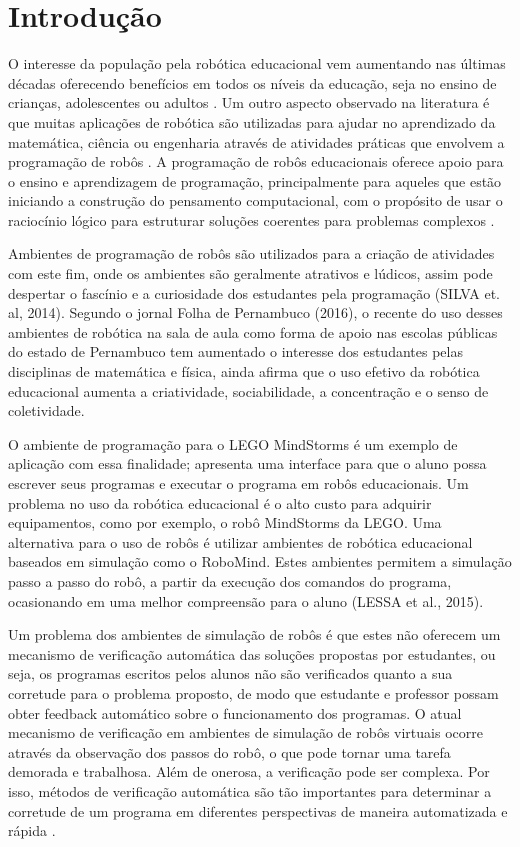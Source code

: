 \chapter{Introdução}

O interesse da população pela robótica educacional vem aumentando nas últimas décadas oferecendo benefícios em todos os níveis da educação, seja no ensino de crianças, adolescentes ou adultos \cite{alimisis}. Um outro aspecto observado na literatura é que muitas aplicações de robótica são utilizadas para ajudar no aprendizado da matemática, ciência ou engenharia através de atividades práticas que envolvem a programação de robôs \cite{Benitti2012}. A programação de robôs educacionais oferece apoio para o ensino e aprendizagem de programação, principalmente para aqueles que estão iniciando a construção do pensamento computacional, com o propósito de usar o raciocínio lógico para estruturar soluções coerentes para problemas complexos \cite{Bombasar2015}.

Ambientes de programação de robôs são utilizados para a criação de atividades com este fim, onde os ambientes são geralmente atrativos e lúdicos, assim pode despertar o fascínio e a curiosidade dos estudantes pela programação (SILVA et. al, 2014). Segundo o jornal Folha de Pernambuco (2016), o recente do uso desses ambientes de robótica na sala de aula como forma de apoio nas escolas públicas do estado de Pernambuco tem aumentado o interesse dos estudantes pelas disciplinas de matemática e física, ainda afirma que o uso efetivo da robótica educacional aumenta a criatividade, sociabilidade, a concentração e o senso de coletividade.

O ambiente de programação para o LEGO MindStorms é um exemplo de aplicação com essa finalidade; apresenta uma interface para que o aluno possa escrever seus programas e executar o programa em robôs educacionais. Um problema no uso da robótica educacional é o alto custo para adquirir equipamentos, como por exemplo, o robô MindStorms da LEGO. Uma alternativa para o uso de robôs é utilizar ambientes de robótica educacional baseados em simulação como o RoboMind. Estes ambientes permitem a simulação passo a passo do robô, a partir da execução dos comandos do programa, ocasionando em uma melhor compreensão para o aluno (LESSA et al., 2015). 

Um problema dos ambientes de simulação de robôs é que estes não oferecem um mecanismo de verificação automática das soluções propostas por estudantes, ou seja, os programas escritos pelos alunos não são verificados quanto a sua corretude para o problema proposto, de modo que estudante e professor possam obter feedback automático sobre o funcionamento dos programas. O atual mecanismo de verificação em ambientes de simulação de robôs virtuais ocorre através da observação dos passos do robô, o que pode tornar uma tarefa demorada e trabalhosa. Além de onerosa, a verificação pode ser complexa. Por isso, métodos de verificação automática são tão importantes para determinar a corretude de um programa em diferentes perspectivas de maneira automatizada e rápida \cite{Duarte}. 

